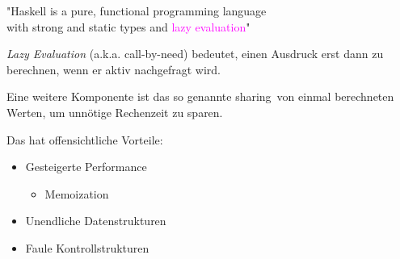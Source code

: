 \documentclass[unknownkeysallowed]{beamer}
\begin{document}

\begin{frame}
\begin{center}

  "Haskell is a pure, functional programming language \\ with strong and static types and \textcolor{magenta}{lazy evaluation}"
  
\end{center}
\end{frame}


\begin{frame}

\emph{Lazy Evaluation} (a.k.a. call-by-need) bedeutet, einen Ausdruck erst dann zu berechnen, wenn er aktiv nachgefragt wird.\bigskip \pause

Eine weitere Komponente ist das so genannte \glqq sharing\grqq\ von einmal berechneten Werten, um unnötige Rechenzeit zu sparen.\bigskip \pause

Das hat offensichtliche Vorteile: \pause \smallskip
\begin{itemize}
\item Gesteigerte Performance \pause
	\begin{itemize}
	\item Memoization
	\end{itemize} \pause
\item Unendliche Datenstrukturen \pause
\item Faule Kontrollstrukturen 
\end{itemize}
\end{frame}

\end{document}
